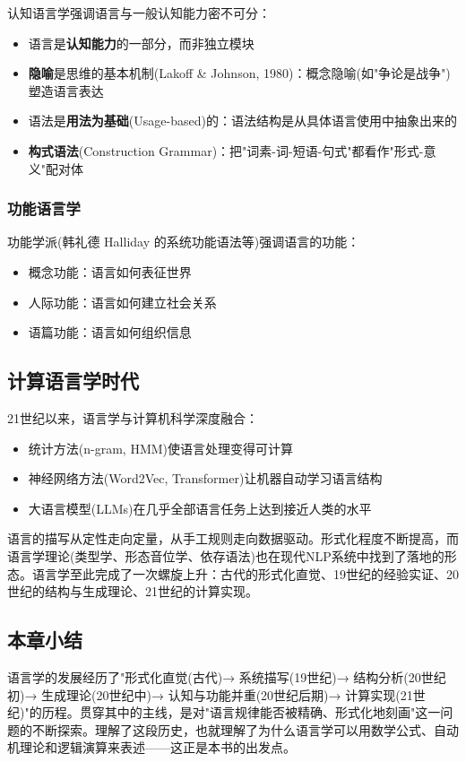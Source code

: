 认知语言学强调语言与一般认知能力密不可分：
\begin{itemize}
    \item 语言是\textbf{认知能力}的一部分，而非独立模块
    \item \textbf{隐喻}是思维的基本机制(Lakoff \& Johnson, 1980)：概念隐喻(如"争论是战争")塑造语言表达
    \item 语法是\textbf{用法为基础}(Usage-based)的：语法结构是从具体语言使用中抽象出来的
    \item \textbf{构式语法}(Construction Grammar)：把"词素-词-短语-句式"都看作"形式-意义"配对体
\end{itemize}

\subsubsection{功能语言学}

功能学派(韩礼德 Halliday 的系统功能语法等)强调语言的功能：
\begin{itemize}
    \item 概念功能：语言如何表征世界
    \item 人际功能：语言如何建立社会关系
    \item 语篇功能：语言如何组织信息
\end{itemize}

\subsection{计算语言学时代}

21世纪以来，语言学与计算机科学深度融合：
\begin{itemize}
    \item 统计方法(n-gram, HMM)使语言处理变得可计算
    \item 神经网络方法(Word2Vec, Transformer)让机器自动学习语言结构
    \item 大语言模型(LLMs)在几乎全部语言任务上达到接近人类的水平
\end{itemize}

语言的描写从定性走向定量，从手工规则走向数据驱动。形式化程度不断提高，而语言学理论(类型学、形态音位学、依存语法)也在现代NLP系统中找到了落地的形态。语言学至此完成了一次螺旋上升：古代的形式化直觉、19世纪的经验实证、20世纪的结构与生成理论、21世纪的计算实现。

\subsection{本章小结}

语言学的发展经历了"形式化直觉(古代)→ 系统描写(19世纪)→ 结构分析(20世纪初)→ 生成理论(20世纪中)→ 认知与功能并重(20世纪后期)→ 计算实现(21世纪)"的历程。贯穿其中的主线，是对"语言规律能否被精确、形式化地刻画"这一问题的不断探索。理解了这段历史，也就理解了为什么语言学可以用数学公式、自动机理论和逻辑演算来表述——这正是本书的出发点。
